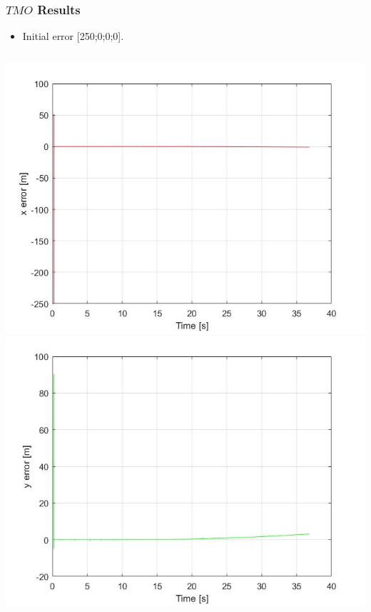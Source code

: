 \documentclass{beamer}
\begin{document}
	\begin{frame}
		\frametitle{$TMO$ Results}
		\begin{itemize}
			\item Initial error [250;0;0;0].
		\end{itemize}
		\begin{columns}[t]
			\centering
			\includegraphics[scale=0.18]{nlo_x_2}\\
			\includegraphics[scale=0.18]{nlo_y_2}
			\centering

\end{columns}
\end{frame}
\end{document}
